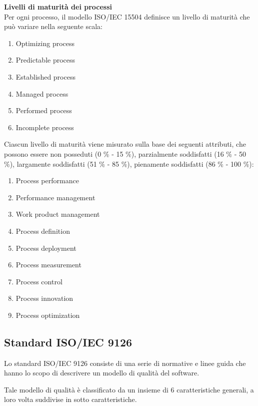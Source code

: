 		\textbf{Livelli di maturità dei processi}\\

		Per ogni processo, il modello ISO/IEC 15504 definisce un livello di maturità che può variare nella seguente scala:
		
		\begin{enumerate}

			\item Optimizing process
			\item Predictable process
			\item Established process
			\item Managed process
			\item Performed process
			\item Incomplete process

		\end{enumerate}
		
		Ciascun livello di maturità viene misurato sulla base dei seguenti attributi, che possono essere non posseduti (0 \% - 15 \%), parzialmente soddisfatti (16 \% - 50 \%), largamente soddisfatti (51 \% - 85 \%), pienamente soddisfatti (86 \% - 100 \%):
		
		\begin{enumerate}
		
			\item Process performance
			\item Performance management
			\item Work product management
			\item Process definition
			\item Process deployment
			\item Process measurement
			\item Process control
			\item Process innovation
			\item Process optimization
			
		\end{enumerate}

	\subsection{Standard ISO/IEC 9126}
	
		Lo standard ISO/IEC 9126 consiste di una serie di normative e linee guida che hanno lo scopo di descrivere un modello di qualità del software. 
		
		Tale modello di qualità è classificato da un insieme di 6 caratteristiche generali, a loro volta suddivise in sotto caratteristiche.
		
